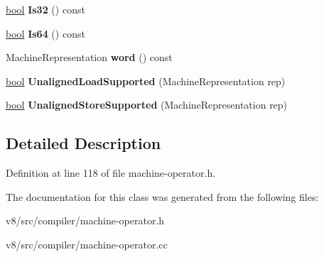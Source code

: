\begin{DoxyCompactItemize}
\mbox{\hyperlink{classbool}{bool}} {\bfseries Is32} () const
\item 
\mbox{\label{classv8_1_1internal_1_1compiler_1_1MachineOperatorBuilder_adcdd074708dd32cd3f95e9dfb74b32ef}} 
\mbox{\hyperlink{classbool}{bool}} {\bfseries Is64} () const
\item 
\mbox{\label{classv8_1_1internal_1_1compiler_1_1MachineOperatorBuilder_a05bf2dd4f74af529c2c35ee6ef66acc6}} 
Machine\+Representation {\bfseries word} () const
\item 
\mbox{\label{classv8_1_1internal_1_1compiler_1_1MachineOperatorBuilder_a077c309d54617ff9013ac5026d2ca910}} 
\mbox{\hyperlink{classbool}{bool}} {\bfseries Unaligned\+Load\+Supported} (Machine\+Representation rep)
\item 
\mbox{\label{classv8_1_1internal_1_1compiler_1_1MachineOperatorBuilder_a7adc7a20b77c61851b3ca02ec6bd2b49}} 
\mbox{\hyperlink{classbool}{bool}} {\bfseries Unaligned\+Store\+Supported} (Machine\+Representation rep)
\end{DoxyCompactItemize}


\subsection{Detailed Description}


Definition at line 118 of file machine-\/operator.\+h.



The documentation for this class was generated from the following files\+:\begin{DoxyCompactItemize}
\item 
v8/src/compiler/machine-\/operator.\+h\item 
v8/src/compiler/machine-\/operator.\+cc\end{DoxyCompactItemize}

